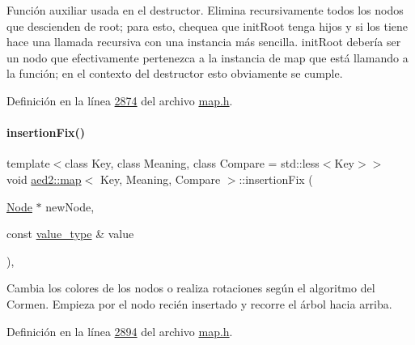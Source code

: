 Función auxiliar usada en el destructor. Elimina recursivamente todos los nodos que descienden de root; para esto, chequea que init\+Root tenga hijos y si los tiene hace una llamada recursiva con una instancia más sencilla. init\+Root debería ser un nodo que efectivamente pertenezca a la instancia de map que está llamando a la función; en el contexto del destructor esto obviamente se cumple. 



Definición en la línea \hyperlink{map_8h_source_l02874}{2874} del archivo \hyperlink{map_8h_source}{map.\+h}.

\mbox{\label{classaed2_1_1map_abe3f47a745e17a6327943b813ff6bfb3_abe3f47a745e17a6327943b813ff6bfb3}} 
\paragraph{\texorpdfstring{insertion\+Fix()}{insertionFix()}}
{\footnotesize\ttfamily template$<$class Key, class Meaning, class Compare = std\+::less$<$\+Key$>$$>$ \\
void \hyperlink{classaed2_1_1map}{aed2\+::map}$<$ Key, Meaning, Compare $>$\+::insertion\+Fix (\begin{DoxyParamCaption}\item[{\hyperlink{structaed2_1_1map_1_1Node}{Node} $\ast$}]{new\+Node,  }\item[{const \hyperlink{classaed2_1_1map_a719db98e0ff9a837610f76be33264680_a719db98e0ff9a837610f76be33264680}{value\+\_\+type} \&}]{value }\end{DoxyParamCaption})\hspace{0.3cm}{\ttfamily [inline]}, {\ttfamily [private]}}



Cambia los colores de los nodos o realiza rotaciones según el algoritmo del Cormen. Empieza por el nodo recién insertado y recorre el árbol hacia arriba. 



Definición en la línea \hyperlink{map_8h_source_l02894}{2894} del archivo \hyperlink{map_8h_source}{map.\+h}.

\mbox{\label{classaed2_1_1map_ad764851f1534f2db0964c4f729056a1e_ad764851f1534f2db0964c4f729056a1e}} 
